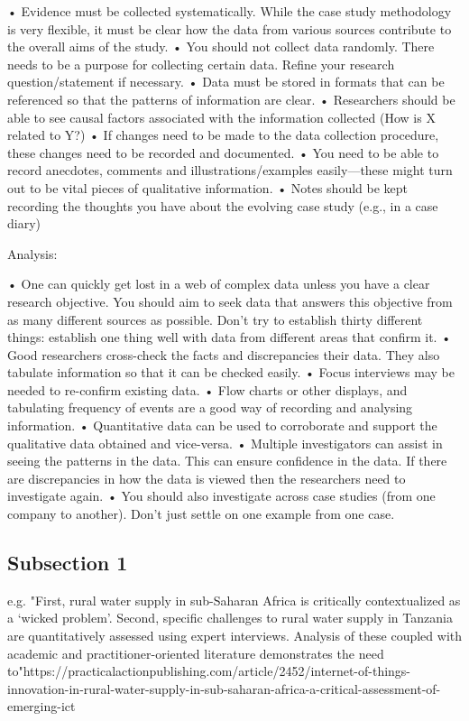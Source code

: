 •	 Evidence must be collected systematically. While the case study methodology is
very flexible, it must be clear how the data from various sources contribute to the
overall aims of the study.
•	 You should not collect data randomly. There needs to be a purpose for collecting
certain data. Refine your research question/statement if necessary.
•	 Data must be stored in formats that can be referenced so that the patterns of
information are clear.
•	 Researchers should be able to see causal factors associated with the information
collected (How is X related to Y?)
•	 If changes need to be made to the data collection procedure, these changes need to
be recorded and documented.
•	 You need to be able to record anecdotes, comments and illustrations/examples
easily—these might turn out to be vital pieces of qualitative information.
•	 Notes should be kept recording the thoughts you have about the evolving case
study (e.g., in a case diary)

Analysis:

•	 One can quickly get lost in a web of complex data unless you have a clear research
objective. You should aim to seek data that answers this objective from as many
different sources as possible. Don’t try to establish thirty different things: establish
one thing well with data from different areas that confirm it.
•	 Good researchers cross-check the facts and discrepancies their data. They also
tabulate information so that it can be checked easily.
•	 Focus interviews may be needed to re-confirm existing data.
•	 Flow charts or other displays, and tabulating frequency of events are a good way of
recording and analysing information.
•	 Quantitative data can be used to corroborate and support the qualitative data
obtained and vice-versa.
•	 Multiple investigators can assist in seeing the patterns in the data. This can ensure
confidence in the data. If there are discrepancies in how the data is viewed then the
researchers need to investigate again.
•	 You should also investigate across case studies (from one company to another).
Don’t just settle on one example from one case.

\subsection{Subsection 1}
e.g.
"First, rural water supply in sub-Saharan Africa is critically contextualized as a ‘wicked problem’. Second, specific challenges to rural water supply in Tanzania are quantitatively assessed using expert interviews. Analysis of these coupled with academic and practitioner-oriented literature demonstrates the need to"https://practicalactionpublishing.com/article/2452/internet-of-things-innovation-in-rural-water-supply-in-sub-saharan-africa-a-critical-assessment-of-emerging-ict

